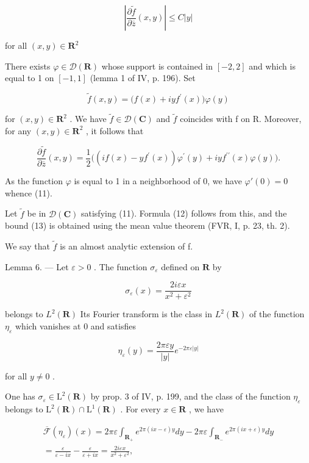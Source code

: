 \[
\left| \frac {\partial \widetilde {f}}{\partial \overline {{z}}} (x, y) \right| \leqslant C | y |\tag{13}
\]

for all \((x,y)\in \mathbf{R}^2\)

There exists \(\varphi\in\mathcal{D}(\mathbf{R})\) whose support is contained in \([-2,2]\) and which is equal to 1 on \([-1,1]\) (lemma 1 of IV, p. 196). Set

\[
\widetilde {f} (x, y) = \bigl (f (x) + i y f ^ {\prime} (x) \bigr) \varphi (y)
\]

for \((x,y)\in\mathbf{R}^{2}\) . We have \(\widetilde{f}\in\mathcal{D}(\mathbf{C})\) and \(\widetilde{f}\) coincides with f on R. Moreover, for any \((x,y)\in\mathbf{R}^{2}\) , it follows that

\[
\frac {\partial \widetilde {f}}{\partial \overline {{z}}} (x, y) = \frac {1}{2} \Big ((i f (x) - y f ^ {\prime} (x)) \varphi^ {\prime} (y) + i y f ^ {\prime \prime} (x) \varphi (y) \Big).
\]

As the function \(\varphi\) is equal to 1 in a neighborhood of 0, we have \(\varphi'(0) = 0\) whence (11).

Let \(\tilde{f}\) be in \(\mathcal{D}(\mathbf{C})\) satisfying (11). Formula (12) follows from this, and the bound (13) is obtained using the mean value theorem (FVR, I, p. 23, th. 2).

We say that \(\tilde{f}\) is an almost analytic extension of f.

Lemma 6. --- Let \(\varepsilon > 0\) . The function \(\sigma_{\varepsilon}\) defined on \(\mathbf{R}\) by

\[
\sigma_ {\varepsilon} (x) = \frac {2 i \varepsilon x}{x ^ {2} + \varepsilon^ {2}}
\]

belongs to \(L^{2}(\mathbf{R})\) Its Fourier transform is the class in \(L^{2}(\mathbf{R})\) of the function \(\eta_{\varepsilon}\) which vanishes at 0 and satisfies

\[
\eta_ {\varepsilon} (y) = \frac {2 \pi \varepsilon y}{| y |} e ^ {- 2 \pi \varepsilon | y |}
\]

for all \(y \neq 0\) .

One has \(\sigma_{\varepsilon} \in \mathrm{L}^{2}(\mathbf{R})\) by prop. 3 of IV, p. 199, and the class of the function \(\eta_{\varepsilon}\) belongs to \(\mathrm{L}^{2}(\mathbf{R}) \cap \mathrm{L}^{1}(\mathbf{R})\) . For every \(x \in \mathbf{R}\) , we have

\[
\begin{array}{r} \overline {{\mathcal {F}}} (\eta_ {\varepsilon}) (x) = 2 \pi \varepsilon \int_ {\mathbf {R} _ {+}} e ^ {2 \pi (i x - \varepsilon) y} d y - 2 \pi \varepsilon \int_ {\mathbf {R} _ {-}} e ^ {2 \pi (i x + \varepsilon) y} d y \\ = \frac {\varepsilon}{\varepsilon - i x} - \frac {\varepsilon}{\varepsilon + i x} = \frac {2 i \varepsilon x}{x ^ {2} + \varepsilon^ {2}}, \end{array}
\]

